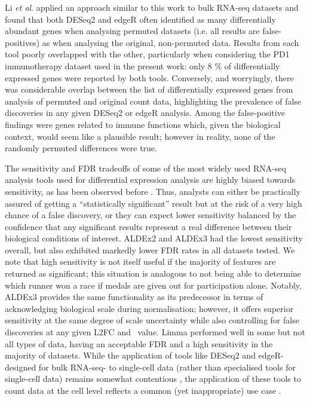 \documentclass[10pt,letterpaper]{article}
\begin{document}
Li \textit{et al}. \cite{li_exaggerated_2022} applied an approach similar to this work to bulk RNA-seq datasets and found that both DESeq2 and edgeR often identified as many differentially abundant genes when analysing permuted datasets (i.e. all results are false-positives) as when analysing the original, non-permuted data. Results from each tool poorly overlapped with the other, particularly when considering the PD1 immunotherapy dataset used in the present work: only 8 \% of differentially expressed genes were reported by both tools. Conversely, and worryingly, there was considerable overlap between the list of differentially expressed genes from analysis of permuted and original count data, highlighting the prevalence of false discoveries in any given DESeq2 or edgeR analysis. Among the false-positive findings were genes related to immune functions which, given the biological context, would seem like a plausible result; however in reality, none of the randomly permuted differences were true.

The sensitivity and FDR tradeoffs of some of the most widely used RNA-seq analysis tools used for differential expression analysis are highly biased towards sensitivity, as has been observed before \cite{hawinkel2017, weiss_normalization_2017, Nearing:2022aa, li_exaggerated_2022}. Thus, analysts can either be practically assured of getting a ``statistically significant'' result but at the risk of a very high chance of a false discovery, or they can expect lower sensitivity balanced by the confidence that any significant results represent a real difference between their biological conditions of interest. ALDEx2 and ALDEx3 had the lowest sensitivity overall, but also exhibited markedly lower FDR rates in all datasets tested. We note that high sensitivity is not itself useful if the majority of features are returned as significant; this situation is analogous to not being able to determine which runner won a race if medals are given out for participation alone. Notably, ALDEx3 provides the same functionality as its predecessor in terms of acknowledging biological scale during normalisation; however, it offers superior sensitivity at the same degree of scale uncertainty while also controlling for false discoveries at any given L2FC and \textgamma~value. Limma performed well in some but not all types of data, having an acceptable FDR and a high sensitivity in the majority of datasets. While the application of tools like DESeq2 and edgeR- designed for bulk RNA-seq- to single-cell data (rather than specialised tools for single-cell data) remains somewhat contentious \cite{murphy_balanced_2022}, the application of these tools to count data at the cell level reflects a common (yet inappropriate) use case \cite{junttila_benchmarking_2022,squair_confronting_2021,Nearing:2022aa, regueira-iglesias_critical_2023}. 
\end{document}
